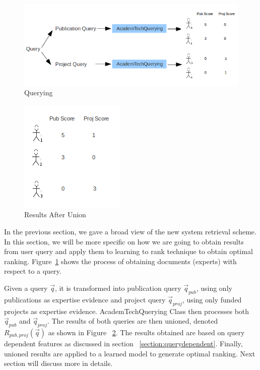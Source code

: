 \begin{figure}
\centering
\includegraphics[scale=0.7]{./figures/querying.png}
\caption{Querying} \label{fig:quering} 
\end{figure}
\quad
\begin{figure}
\centering
\includegraphics[scale=0.7]{./figures/union.png}
\caption{Results After Union} \label{fig:union} 
\end{figure}
In the previous section, we gave a broad view of the new system retrieval scheme. In this section, we will be more specific on how we are going to 
obtain results from user query and apply them to learning to rank technique to obtain optimal ranking.
Figure~\ref{fig:quering} shows the process of obtaining documents (experts) with respect to a query. 

Given a query $\vec{q}$, it is transformed into publication query $\vec{q}_{pub}$, using only publications as expertise evidence and project
query $\vec{q}_{proj}$, using only funded projects as expertise evidence. 
AcademTechQuerying Class then processes both $\vec{q}_{pub}$ and $\vec{q}_{proj}$. The results of both
queries are then unioned, denoted $R_{pub,proj}(\vec{q})$ as shown in Figure ~\ref{fig:union}. The results obtained are based on query dependent features as discussed in section 
~\ref{section:querydependent}. Finally, unioned results are applied to a learned model to generate optimal ranking. Next section will discuss more in
details.

